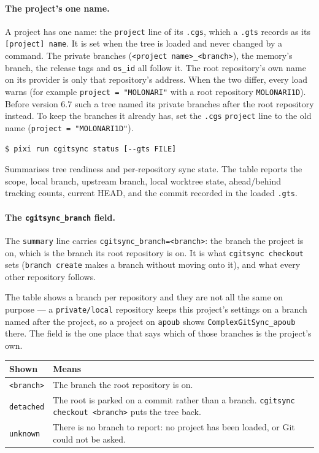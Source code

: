 \paragraph{The project's one name.}
A project has one name: the \texttt{project} line of its \texttt{.cgs}, which a
\texttt{.gts} records as its \texttt{[project] name}. It is set when the tree is
loaded and never changed by a command. The private branches
(\texttt{<project name>\_<branch>}), the memory's branch, the release tags and
\texttt{os\_id} all follow it. The root repository's own name on its provider
is only that repository's address. When the two differ, every load warns
(for example \texttt{project = "MOLONARI"} with a root repository
\texttt{MOLONARI1D}). Before version 6.7 such a tree named its private
branches after the root repository instead. To keep the branches it already
has, set the \texttt{.cgs} \texttt{project} line to the old name
(\texttt{project = "MOLONARI1D"}).

\begin{lstlisting}[language=bash]
$ pixi run cgitsync status [--gts FILE]
\end{lstlisting}

Summarises tree readiness and per-repository sync state. The table reports
the scope, local branch, upstream branch, local worktree state,
ahead/behind tracking counts, current HEAD, and the commit recorded in the
loaded \texttt{.gts}.

\paragraph{The \texttt{cgitsync\_branch} field.} The \texttt{summary} line
carries \texttt{cgitsync\_branch=<branch>}: the branch the project is on,
which is the branch its root repository is on. It is what
\texttt{cgitsync checkout} sets (\texttt{branch create} makes a branch
without moving onto it), and what every other repository follows.

The table shows a branch per repository and they are not all the same on
purpose --- a \texttt{private/local} repository keeps this project's
settings on a branch named after the project, so a project on
\texttt{apoub} shows \texttt{ComplexGitSync\_apoub} there. The field is the
one place that says which of those branches is the project's own.

\begin{center}
\begin{tabular}{lp{10.5cm}}
\textbf{Shown} & \textbf{Means} \\
\hline
\texttt{<branch>}  & The branch the root repository is on. \\
\texttt{detached}  & The root is parked on a commit rather than a branch.
                     \texttt{cgitsync checkout <branch>} puts the tree
                     back. \\
\texttt{unknown}   & There is no branch to report: no project has been
                     loaded, or Git could not be asked. \\
\end{tabular}
\end{center}

